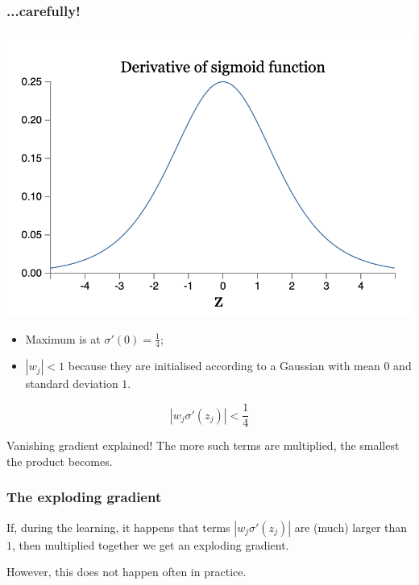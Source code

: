 \documentclass[usenames,dvipsnames]{beamer}
\begin{document}
\begin{frame}
  \frametitle{...carefully!}
  
\begin{minipage}[c]{.45\textwidth}
	\centering
	\includegraphics[scale=.4]{sigma-deriv} 
\end{minipage} \hfill \begin{minipage}[c]{.45\textwidth}
\begin{itemize}
  \item Maximum is at $\sigma'(0) = \frac{1}{4}$;
  \item $|w_j| < 1$ because they are initialised according to a Gaussian with mean $0$ and standard deviation $1$.
 \end{itemize}
\end{minipage}

\centering \pause

\[ |w_j \sigma'(z_j) | < \frac{1}{4} \]


\begin{alertblock}{Vanishing gradient explained!}
The more such terms are multiplied, 	the smallest the product becomes.
\end{alertblock}
\end{frame}

\begin{frame}
  \frametitle{The exploding gradient}
  
  If, during the learning, it happens that terms $|w_j \sigma'(z_j)|$ are (much) larger than $1$, then multiplied together we get an exploding gradient.
  
  \largeskip
  
  \begin{ntblock}
  \centering
  However, this does not happen often in practice.	
  \end{ntblock}
\end{frame}
\end{document}
